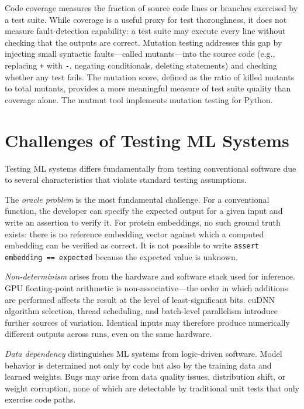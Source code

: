 Code coverage measures the fraction of source code lines or branches exercised by a test suite. While coverage is a useful proxy for test thoroughness, it does not measure fault-detection capability: a test suite may execute every line without checking that the outputs are correct. Mutation testing addresses this gap by injecting small syntactic faults---called mutants---into the source code (e.g., replacing \texttt{+} with \texttt{-}, negating conditionals, deleting statements) and checking whether any test fails. The mutation score, defined as the ratio of killed mutants to total mutants, provides a more meaningful measure of test suite quality than coverage alone. The mutmut tool implements mutation testing for Python.

\section{Challenges of Testing ML Systems}\label{sec:ml-testing-challenges}

Testing \ac{ML} systems differs fundamentally from testing conventional software due to several characteristics that violate standard testing assumptions.

The \emph{oracle problem} is the most fundamental challenge. For a conventional function, the developer can specify the expected output for a given input and write an assertion to verify it. For protein embeddings, no such ground truth exists: there is no reference embedding vector against which a computed embedding can be verified as correct. It is not possible to write \texttt{assert embedding == expected} because the expected value is unknown.

\emph{Non-determinism} arises from the hardware and software stack used for inference. \ac{GPU} floating-point arithmetic is non-associative---the order in which additions are performed affects the result at the level of least-significant bits. cuDNN algorithm selection, thread scheduling, and batch-level parallelism introduce further sources of variation. Identical inputs may therefore produce numerically different outputs across runs, even on the same hardware.

\emph{Data dependency} distinguishes \ac{ML} systems from logic-driven software. Model behavior is determined not only by code but also by the training data and learned weights. Bugs may arise from data quality issues, distribution shift, or weight corruption, none of which are detectable by traditional unit tests that only exercise code paths.

